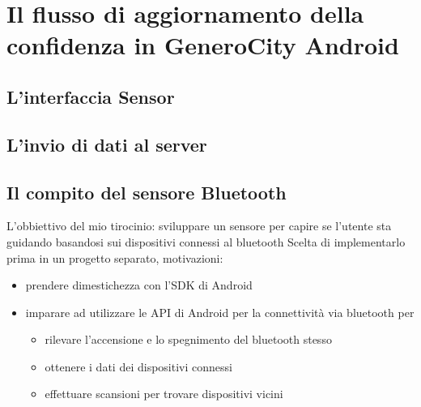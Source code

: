 \section{Il flusso di aggiornamento della confidenza in GeneroCity Android}

\subsection{L'interfaccia Sensor}
\subsection{L'invio di dati al server}
\subsection{Il compito del sensore Bluetooth}
L'obbiettivo del mio tirocinio: sviluppare un sensore per capire se l'utente sta guidando basandosi sui dispositivi connessi al bluetooth
Scelta di implementarlo prima in un progetto separato, motivazioni:
\begin{itemize}
    \item prendere dimestichezza con l'SDK di Android
    \item imparare ad utilizzare le API di Android per la connettività via bluetooth per
    \begin{itemize}
        \item rilevare l'accensione e lo spegnimento del bluetooth stesso
        \item ottenere i dati dei dispositivi connessi
        \item effettuare scansioni per trovare dispositivi vicini
    \end{itemize}
\end{itemize}
